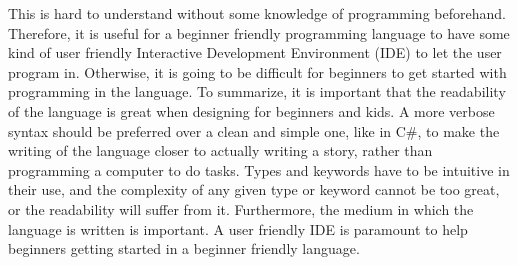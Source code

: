 This is hard to understand without some knowledge of programming beforehand. Therefore, it is useful for a beginner friendly programming language to have some kind of user friendly Interactive Development Environment (IDE) to let the user program in. Otherwise, it is going to be difficult for beginners to get started with programming in the language.
To summarize, it is important that the readability of the language is great when designing for beginners and kids. A more verbose syntax should be preferred over a clean and simple one, like in C\#\cite{CSHARP}, to make the writing of the language closer to actually writing a story, rather than programming a computer to do tasks. Types and keywords have to be intuitive in their use, and the complexity of any given type or keyword cannot be too great, or the readability will suffer from it. Furthermore, the medium in which the language is written is important. A user friendly IDE is paramount to help beginners getting started in a beginner friendly language.